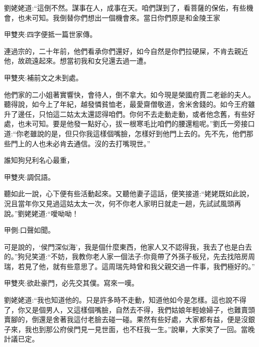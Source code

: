 \begin{parag}
    劉姥姥道:“這倒不然。謀事在人，成事在天。咱們謀到了，看菩薩的保佑，有些機會，也未可知。我倒替你們想出一個機會來。當日你們原是和金陵王家\begin{note}甲雙夾:四字便抵一篇世家傳。\end{note}連過宗的，二十年前，他們看承你們還好，如今自然是你們拉硬屎，不肯去親近他，故疏遠起來。想當初我和女兒還去過一遭。\begin{note}甲雙夾:補前文之未到處。\end{note}他們家的二小姐著實響快，會待人，倒不拿大。如今現是榮國府賈二老爺的夫人。聽得說，如今上了年紀，越發憐貧恤老，最愛齋僧敬道，舍米舍錢的。如今王府雖升了邊任，只怕這二姑太太還認得咱們。你何不去走動走動，或者他念舊，有些好處，也未可知。要是他發一點好心，拔一根寒毛比咱們的腰還粗呢。”劉氏一旁接口道:“你老雖說的是，但只你我這樣個嘴臉，怎樣好到他門上去的。先不先，他們那些門上的人也未必肯去通信。沒的去打嘴現世。”
\end{parag}


\begin{parag}
    誰知狗兒利名心最重，\begin{note}甲雙夾:調侃語。\end{note}聽如此一說，心下便有些活動起來。又聽他妻子這話，便笑接道:“姥姥既如此說，況且當年你又見過這姑太太一次，何不你老人家明日就走一趟，先試試風頭再說。”劉姥姥道:“噯呦呦！\begin{note}甲側:口聲如聞。\end{note}可是說的，‘侯門深似海’，我是個什麼東西，他家人又不認得我，我去了也是白去的。”狗兒笑道:“不妨，我教你老人家一個法子:你竟帶了外孫子板兒，先去找陪房周瑞，若見了他，就有些意思了。這周瑞先時曾和我父親交過一件事，我們極好的。”\begin{note}甲雙夾:欲赴豪門，必先交其僕。寫來一嘆。\end{note}劉姥姥道:“我也知道他的。只是許多時不走動，知道他如今是怎樣。這也說不得了，你又是個男人，又這樣個嘴臉，自然去不得，我們姑娘年輕媳婦子，也難賣頭賣腳的，倒還是舍著我這付老臉去碰一碰。果然有些好處，大家都有益，便是沒銀子來，我也到那公府侯門見一見世面，也不枉我一生。”說畢，大家笑了一回。當晚計議已定。
\end{parag}


